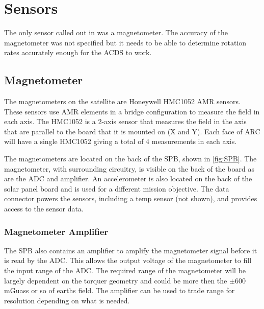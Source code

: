 

\section{Sensors}

The only sensor called out in \cite{Mentch11} was a magnetometer. The accuracy of the magnetometer was not specified but it needs to be able to determine rotation rates accurately enough for the \ac{ACDS} to work.

\subsection{Magnetometer}

The magnetometers on the satellite are Honeywell HMC1052 \ac{AMR} sensors. These sensors use \ac{AMR} elements in a bridge configuration to measure the field in each axis. The HMC1052 is a 2-axis sensor that measures the field in the axis that are parallel to the board that it is mounted on (X and Y). Each face of \ac{ARC} will have a single HMC1052 giving a total of 4 measurements in each axis.

The magnetometers are located on the back of the \acs{SPB}, shown in \cref{fig:SPB}. The magnetometer, with surrounding circuitry, is visible on the back of the board as are the ADC and amplifier. An accelerometer is also located on the back of the solar panel board and is used for a different mission objective. The data connector powers the sensors, including a temp sensor (not shown), and provides access to the sensor data.

\subsubsection{Magnetometer Amplifier}


The \ac{SPB} also contains an amplifier to amplify the magnetometer signal before it is read by the \ac{ADC}. This allows the output voltage of the magnetometer to fill the input range of the \ac{ADC}. The required range of the magnetometer will be largely dependent on the torquer geometry and could be more then the $\pm$600 mGuass or so of earths field. The amplifier can be used to trade range for resolution depending on what is needed.

